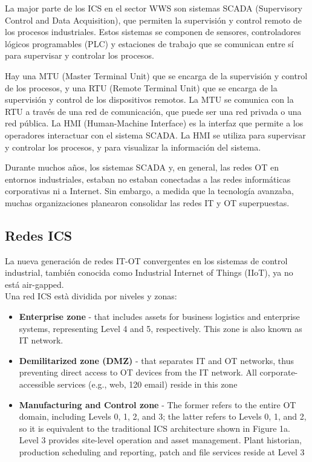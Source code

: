 La major parte de los ICS en el sector WWS son sistemas SCADA (Supervisory Control and Data Acquisition), que permiten la supervisión y control remoto de los procesos industriales. Estos sistemas se componen de sensores, controladores lógicos programables (PLC) y estaciones de trabajo que se comunican entre sí para supervisar y controlar los procesos.

Hay una MTU (Master Terminal Unit) que se encarga de la supervisión y control de los procesos, y una RTU (Remote Terminal Unit) que se encarga de la supervisión y control de los dispositivos remotos. La MTU se comunica con la RTU a través de una red de comunicación, que puede ser una red privada o una red pública.
La HMI (Human-Machine Interface) es la interfaz que permite a los operadores interactuar con el sistema SCADA. La HMI se utiliza para supervisar y controlar los procesos, y para visualizar la información del sistema.

Durante muchos años, los sistemas SCADA y, en general, las redes OT en entornos industriales, estaban
no estaban conectadas a las redes informáticas corporativas ni a Internet. Sin embargo, a medida que la tecnología avanzaba, muchas organizaciones planearon consolidar las redes IT y OT superpuestas.

\subsection{Redes ICS}

La nueva generación de redes IT-OT convergentes en los sistemas de control industrial, también conocida como Industrial Internet of Things (IIoT), ya no está air-gapped.\\
Una red ICS està dividida por niveles y zonas:
\begin{itemize}
   \item \textbf{Enterprise zone }- that includes assets for business logistics and enterprise systems, representing Level 4 and 5, respectively. This zone is also known as IT network.
   \item \textbf{Demilitarized zone (DMZ) }- that separates IT and OT networks, thus preventing direct access to OT devices from the IT network. All corporate-accessible services (e.g., web, 120 email) reside in this zone
   \item \textbf{Manufacturing and Control zone }- The former refers to the entire OT domain, including Levels 0, 1, 2, and 3; the latter refers to Levels 0, 1, and 2, so it is equivalent to the traditional ICS architecture shown in Figure 1a. Level 3 provides site-level operation and asset management. Plant historian, production scheduling and reporting, patch and file services reside at Level 3
\end{itemize}


